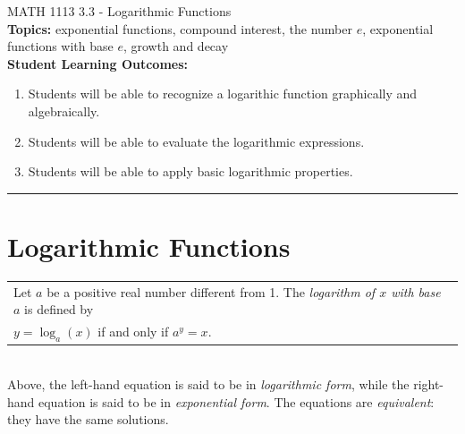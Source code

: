 \documentclass[11pt]{article}
\begin{document}
\noindent MATH 1113   \hfill 3.3 - Logarithmic Functions\\



\noindent \textbf{Topics:}  exponential functions, compound interest, the number $e$, exponential functions with base $e$, growth and decay\\

\noindent \textbf{Student Learning Outcomes:}
\begin{enumerate}
\item Students will be able to recognize a logarithic function graphically and algebraically.
\item Students will be able to evaluate the logarithmic expressions.
\item Students will be able to apply basic logarithmic properties.
\end{enumerate}

\hrule 
\vspace{5mm}
\section{Logarithmic Functions}
\noindent\begin{tabular}{ | l  |} \hline
\noindent  Let $a$ be a positive real number different from 1. The \emph{logarithm of $x$ with base $a$} is defined by   \\
\hspace{1.5in} $y = \log_a(x)$    if and only if   $a^y=x$. \\  \hline
\end{tabular} \\

\noindent Above, the left-hand equation is said to be in \emph{logarithmic form}, while the right-hand equation is said to be in \emph{exponential form}. The equations are \emph{equivalent}: they have the same solutions. 
\end{document}
